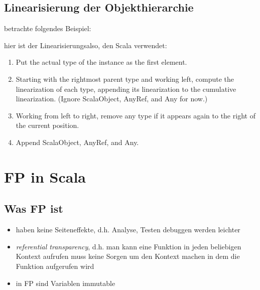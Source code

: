 \subsection{Linearisierung der Objekthierarchie}
betrachte folgendes Beispiel:




hier ist der Linearisierungsalso, den Scala verwendet:

\begin{enumerate}
  \item Put the actual type of the instance as the first element.
  \item Starting with the rightmost parent type and working left, compute the linearization
of each type, appending its linearization to the cumulative linearization. (Ignore
ScalaObject, AnyRef, and Any for now.)
  \item Working from left to right, remove any type if it appears again to the right of the
current position.
  \item Append ScalaObject, AnyRef, and Any.
\end{enumerate}
\pagebreak


\section{FP in Scala}


\subsection{Was FP ist}
\begin{itemize}
  \item haben keine Seiteneffekte, d.h. Analyse, Testen \und debuggen
  werden leichter
  \item \textit{referential transparency}, d.h. man kann eine Funktion
  in jeden beliebigen Kontext aufrufen \und muss keine Sorgen um den
  Kontext machen in dem die Funktion aufgerufen wird
  \item in FP sind Variablen immutable
\end{itemize}


